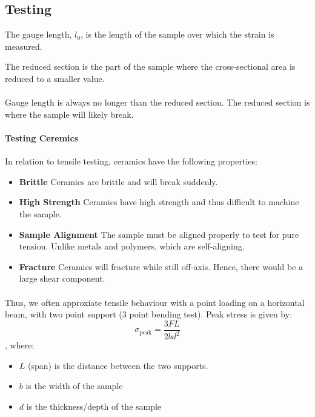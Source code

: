 \documentclass[11pt]{article}
\begin{document}
\subsection{Testing}
\begin{definition}
The gauge length, $l_0$, is the length of the sample over which the strain is measured.
\end{definition}
\begin{definition}
The reduced section is the part of the sample where the cross-sectional area is reduced to a smaller value.
\end{definition}
\paragraph{} Gauge length is always no longer than the reduced section. The reduced section is where the sample will likely break.
\paragraph{Testing Ceremics} In relation to tensile testing, ceramics have the following properties:
\begin{itemize}
    \item \textbf{Brittle} Ceramics are brittle and will break suddenly.
    \item \textbf{High Strength} Ceramics have high strength and thus difficult to machine the sample.
    \item \textbf{Sample Alignment} The sample must be aligned properly to test for pure tension. Unlike metals and polymers, which are self-aligning.
    \item \textbf{Fracture} Ceramics will fracture while still off-axis. Hence, there would be a large shear component. 
\end{itemize}
\paragraph{} Thus, we often approxiate tensile behaviour with a point loading on a horizontal beam, with two point support (3 point bending test). Peak stress is given by:
\begin{equation}
    \sigma_{\text{peak}} = \frac{3FL}{2bd^2}
\end{equation}
, where:
\begin{itemize}
    \item $L$ (span) is the distance between the two supports.
    \item $b$ is the width of the sample
    \item $d$ is the thickness/depth of the sample
\end{itemize}
\end{document}
